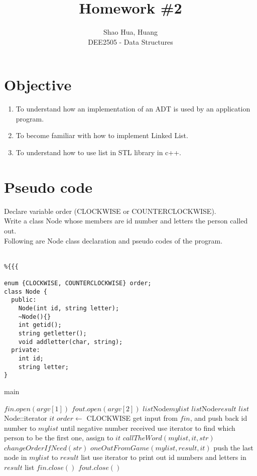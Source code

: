 \documentclass[12pt]{article}%
\title{Homework \#2}
\author{Shao Hua, Huang\\
DEE2505 - Data Structures}
\begin{document}
\maketitle
\section{Objective}
\begin{enumerate}
  \item To understand how an implementation of an ADT is used by an application program.
  \item To become familiar with how to implement Linked List.
  \item To understand how to use list in STL library in c++.
\end{enumerate}
\section{Pseudo code}
Declare variable order (CLOCKWISE or COUNTERCLOCKWISE).\\
Write a class Node whose members are id number and letters the person called out.\\
Following are Node class declaration and pseudo codes of the program.\\\\
\begin{lstlisting}%{{{

enum {CLOCKWISE, COUNTERCLOCKWISE} order;
class Node {
  public:
    Node(int id, string letter);
    ~Node(){}
    int getid();
    string getletter();
    void addletter(char, string);
  private:
    int id;
    string letter;
}
\end{lstlisting}%
\begin{algorithm}%
  \caption{main}
  \begin{algorithmic}[1]
    \State $fin.open(argv[1])$
    \State $fout.open(argv[2])$
    \State $list$\textlangle Node\textrangle $mylist$
    \State $list$\textlangle Node\textrangle $result$
    \State $list$\textlangle Node\textrangle::iterator $it$
    \State $order \gets$ CLOCKWISE
    \State get input from $fin$, and push back id number to $mylist$ until negative number received
    \State use iterator to find which person to be the first one, assign to $it$
      \State $callTheWord(mylist, it, str)$
      \State $changeOrderIfNeed(str)$
      \State $oneOutFromGame(mylist, result, it)$
    \EndWhile
    \State push the last node in $mylist$ to $result$ list
    \State use iterator to print out id numbers and letters in $result$ list
    \State $fin.close()$
    \State $fout.close()$
  \end{algorithmic}
\end{algorithm}%
\end{document}
